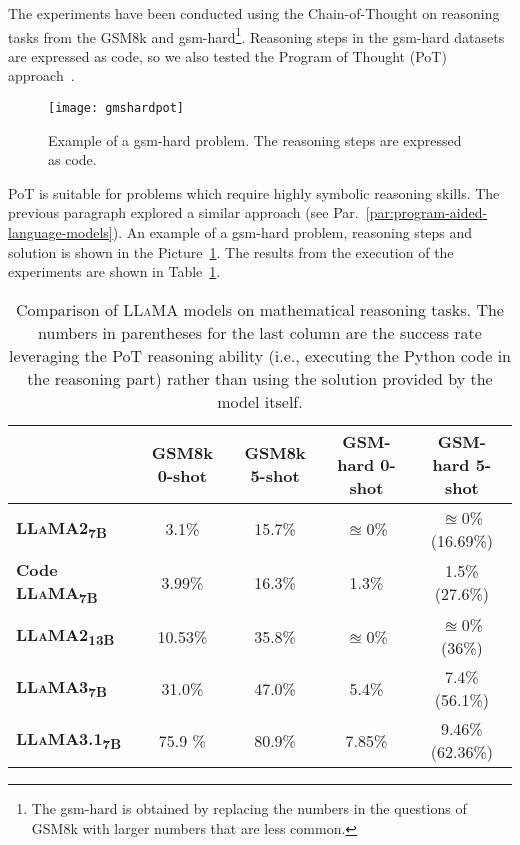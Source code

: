The experiments have been conducted using the Chain-of-Thought on reasoning tasks from the GSM8k and gsm-hard\footnote{The gsm-hard is obtained by replacing the numbers in the questions of GSM8k with larger numbers that are less common.}.
Reasoning steps in the gsm-hard datasets are expressed as code, so we also tested the Program of Thought (PoT) approach~\cite{chen2022program}.
\begin{figure}[h!]
	\centering
	\texttt{[image: gmshardpot]}
	\caption{Example of a gsm-hard problem. The reasoning steps are expressed as code.}
	\label{fig:pot-example}
\end{figure}
PoT is suitable for problems which require highly symbolic reasoning skills.
The previous paragraph explored a similar approach (see Par.~\ref{par:program-aided-language-models}).
An example of a gsm-hard problem, reasoning steps and solution is shown in the Picture~\ref{fig:pot-example}.
The results from the execution of the experiments are shown in Table~\ref{tab:llama-comparison}.

\begin{table}[h!]
	\centering
	\begin{tabularx}{\textwidth}{Xcccc}
		\toprule
		                                               & \textbf{GSM8k 0-shot} & \textbf{GSM8k 5-shot} & \textbf{GSM-hard 0-shot} & \textbf{GSM-hard 5-shot} \\
		\midrule
		\textbf{\textsc{LLaMA}2\textsubscript{7B}}     & 3.1\%                 & 15.7\%                & $\approxeq$0\%           & $\approxeq$0\% (16.69\%) \\
		\hline
		\textbf{Code \textsc{LLaMA}\textsubscript{7B}} & 3.99\%                & 16.3\%                & 1.3\%                    & 1.5\% (27.6\%)           \\
		\hline
		\textbf{\textsc{LLaMA}2\textsubscript{13B}}    & 10.53\%               & 35.8\%                & $\approxeq$0\%           & $\approxeq$0\%	 (36\%)   \\
		\hline
		\textbf{\textsc{LLaMA}3\textsubscript{7B}}     & 31.0\%                & 47.0\%                & 5.4\%                    & 7.4\% (56.1\%)           \\
		\hline
		\textbf{\textsc{LLaMA}3.1\textsubscript{7B}}   & 75.9 \%               & 80.9\%                & 7.85\%                   & 9.46\% (62.36\%)         \\
		\bottomrule
	\end{tabularx}
	\caption{Comparison of \textsc{LLaMA} models on mathematical reasoning tasks. The numbers in parentheses for the last column are the success rate leveraging the PoT reasoning ability (i.e., executing the Python code in the reasoning part) rather than using the solution provided by the model itself.}
	\label{tab:llama-comparison}
\end{table}


